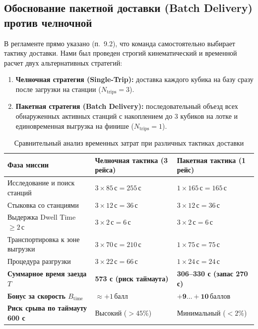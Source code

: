 \documentclass[a4paper,11pt]{article}
\begin{document}
\subsection{Обоснование пакетной доставки (Batch Delivery) против челночной}
В регламенте прямо указано (п.~9.2), что команда самостоятельно выбирает тактику доставки. Нами был проведен строгий кинематический и временной расчет двух альтернативных стратегий:
\begin{enumerate}
    \item \textbf{Челночная стратегия (Single-Trip):} доставка каждого кубика на базу сразу после загрузки на станции ($N_{\text{trips}} = 3$).
    \item \textbf{Пакетная стратегия (Batch Delivery):} последовательный объезд всех обнаруженных активных станций с накоплением до 3 кубиков на лотке и единовременная выгрузка на финише ($N_{\text{trips}} = 1$).
\end{enumerate}

\begin{table}[htbp]
\centering
\small
\begin{tabularx}{\textwidth}{X>{\centering\arraybackslash}p{4.8cm}>{\centering\arraybackslash}p{4.8cm}}
\toprule
\textbf{Фаза миссии} & \textbf{Челночная тактика (3 рейса)} & \textbf{Пакетная тактика (1 рейс)} \\
\midrule
Исследование и поиск станций & $3 \times 85\,\text{с} = 255\,\text{с}$ & $1 \times 165\,\text{с} = 165\,\text{с}$ \\
Стыковка со станциями & $3 \times 12\,\text{с} = 36\,\text{с}$ & $3 \times 12\,\text{с} = 36\,\text{с}$ \\
Выдержка Dwell Time $\ge 2$\,с & $3 \times 2\,\text{с} = 6\,\text{с}$ & $3 \times 2\,\text{с} = 6\,\text{с}$ \\
Транспортировка к зоне выгрузки & $3 \times 70\,\text{с} = 210\,\text{с}$ & $1 \times 75\,\text{с} = 75\,\text{с}$ \\
Процедура разгрузки & $3 \times 22\,\text{с} = 66\,\text{с}$ & $1 \times 24\,\text{с} = 24\,\text{с}$ \\
\midrule
\textbf{Суммарное время заезда $T$} & \textbf{573 с (риск таймаута)} & \textbf{306--330 с (запас 270 с)} \\
\textbf{Бонус за скорость $B_{\text{time}}$} & $\approx +1\,\text{балл}$ & $\mathbf{+9\dots+10\,\text{баллов}}$ \\
\textbf{Риск срыва по таймауту 600 с} & Высокий ($> 45\%$) & Минимальный ($< 2\%$) \\
\bottomrule
\end{tabularx}
\caption{Сравнительный анализ временных затрат при различных тактиках доставки}
\label{tab:strategy_comparison}
\end{table}
\end{document}

